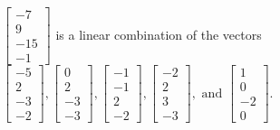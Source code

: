 \begin{exercise}
\begin{exerciseStatement}
  \end{exerciseStatement}
  \begin{exerciseAnswer}
   \(\left[\begin{array}{c}
-7 \\
9 \\
-15 \\
-1
\end{array}\right]\) 
  	 is  
	a linear combination of the vectors \(\left[\begin{array}{c}
-5 \\
2 \\
-3 \\
-2
\end{array}\right] , \left[\begin{array}{c}
0 \\
2 \\
-3 \\
-3
\end{array}\right] , \left[\begin{array}{c}
-1 \\
-1 \\
2 \\
-2
\end{array}\right] , \left[\begin{array}{c}
-2 \\
2 \\
3 \\
-3
\end{array}\right] , \text{ and } \left[\begin{array}{c}
1 \\
0 \\
-2 \\
0
\end{array}\right]\).

	
  


  \end{exerciseAnswer}
\end{exercise}